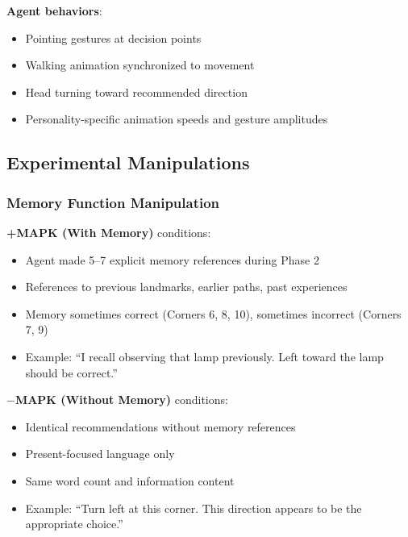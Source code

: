 \documentclass[12pt]{article}
\begin{document}
\textbf{Agent behaviors}:
\begin{itemize}
    \item Pointing gestures at decision points
    \item Walking animation synchronized to movement
    \item Head turning toward recommended direction
    \item Personality-specific animation speeds and gesture amplitudes
\end{itemize}

\subsection{Experimental Manipulations}

\subsubsection{Memory Function Manipulation}

\textbf{+MAPK (With Memory)} conditions:
\begin{itemize}
    \item Agent made 5--7 explicit memory references during Phase 2
    \item References to previous landmarks, earlier paths, past experiences
    \item Memory sometimes correct (Corners 6, 8, 10), sometimes incorrect (Corners 7, 9)
    \item Example: ``I recall observing that lamp previously. Left toward the lamp should be correct.''
\end{itemize}

\textbf{$-$MAPK (Without Memory)} conditions:
\begin{itemize}
    \item Identical recommendations without memory references
    \item Present-focused language only
    \item Same word count and information content
    \item Example: ``Turn left at this corner. This direction appears to be the appropriate choice.''
\end{itemize}
\end{document}
